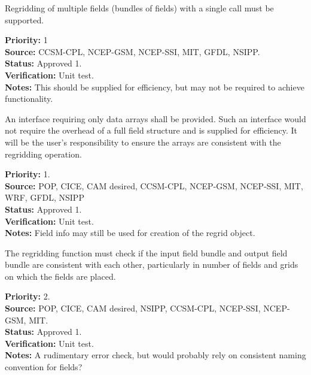 Regridding of multiple fields (bundles of fields) with
a single call must be supported.

\begin{reqlist}
{\bf Priority:} 1  \\
{\bf Source:} CCSM-CPL, NCEP-GSM, NCEP-SSI, MIT, GFDL, NSIPP. \\
{\bf Status:} Approved 1. \\
{\bf Verification:} Unit test. \\
{\bf Notes:} This should be supplied for efficiency, but may not
             be required to achieve functionality.
\end{reqlist}


An interface requiring only data arrays shall be
provided.  Such an interface would not require the overhead
of a full field structure and is supplied for efficiency.
It will be the user's responsibility to ensure the arrays
are consistent with the regridding operation.

\begin{reqlist}
{\bf Priority:} 1. \\
{\bf Source:} POP, CICE, CAM desired, CCSM-CPL, NCEP-GSM, NCEP-SSI, MIT, WRF, GFDL, NSIPP \\
{\bf Status:} Approved 1. \\
{\bf Verification:} Unit test. \\
{\bf Notes:} Field info may still be used for creation of the
             regrid object.
\end{reqlist}


The regridding function must check if the input field bundle and output field
bundle are consistent with each other, particularly in number of fields 
and grids on which the fields are placed.

\begin{reqlist}
{\bf Priority:} 2. \\
{\bf Source:} POP, CICE, CAM desired, NSIPP, CCSM-CPL, NCEP-SSI, NCEP-GSM, MIT. \\
{\bf Status:} Approved 1. \\
{\bf Verification:} Unit test. \\
{\bf Notes:} A rudimentary error check, but would probably rely on
             consistent naming convention for fields?
\end{reqlist}


